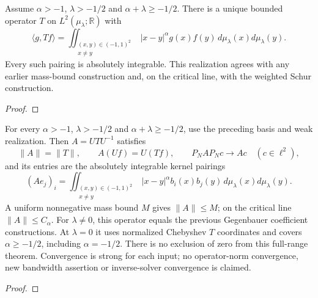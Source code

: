 \begin{supporting}
\begin{theorem}
\label{thm:power-law-full-realization}
\leanok
Assume $\alpha>-1$, $\lambda>-1/2$ and $\alpha+\lambda\ge-1/2$.
There is a unique bounded operator $T$ on $L^2(\mu_\lambda;\mathbb R)$ with
\[
 \langle g,Tf\rangle=\iint_{\substack{(x,y)\in(-1,1)^2\\x\ne y}} |x-y|^\alpha g(x)f(y)\,
 d\mu_\lambda(x)d\mu_\lambda(y).
\]
Every such pairing is absolutely integrable. This realization agrees with
any earlier mass-bound construction and, on the critical line, with the
weighted Schur construction.
\end{theorem}
\begin{proof}
\leanok
\end{proof}
\end{supporting}


\begin{theorem}
\label{thm:power-law-full-coefficients}
\leanok
For every $\alpha>-1$, $\lambda>-1/2$ and $\alpha+\lambda\ge-1/2$,
use the preceding basis and weak realization. Then $A=UTU^{-1}$ satisfies
\[
 \|A\|=\|T\|,\qquad A(Uf)=U(Tf),\qquad
 P_NAP_Nc\longrightarrow Ac\quad(c\in\ell^2),
\]
and its entries are the absolutely integrable kernel pairings
\[
 (Ae_j)_i=\iint_{\substack{(x,y)\in(-1,1)^2\\x\ne y}} |x-y|^\alpha b_i(x)b_j(y)\,
 d\mu_\lambda(x)d\mu_\lambda(y).
\]
A uniform nonnegative mass bound $M$ gives $\|A\|\le M$; on the critical
line $\|A\|\le C_\alpha$. For $\lambda\ne0$, this operator equals the
previous Gegenbauer coefficient constructions. At $\lambda=0$ it uses
normalized Chebyshev $T$ coordinates and covers $\alpha\ge-1/2$, including
$\alpha=-1/2$. There is no exclusion of zero from this full-range theorem.
Convergence is strong for each input; no operator-norm convergence, new
bandwidth assertion or inverse-solver convergence is claimed.
\end{theorem}
\begin{proof}
\leanok
\end{proof}

